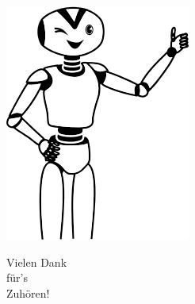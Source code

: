 \documentclass[aspectratio=43,x11names]{beamer}
\begin{document}
\begin{frame}[fragile]

\begin{multicols}{2}

\vspace*{73pt}
\includegraphics[scale=0.6]{images/Happy-Thumbs-Up-Robot.png} 

\columnbreak

\vspace*{40pt}

\Huge
\hspace*{-30pt}Vielen Dank\\ für's\\ Zuhören!
\end{multicols}
\end{frame}
\end{document}
